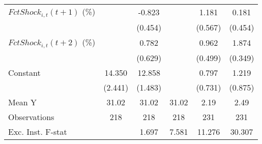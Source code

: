 {\begin{tabular}{l*{5}{c}}
\addlinespace
$ FctShock_{i,t}(t+1)$ (\%)&                     &      -0.823\sym{*}  &                     &       1.181\sym{*}  &       0.181         \\
                    &                     &     (0.454)         &                     &     (0.567)         &     (0.454)         \\
\addlinespace
$ FctShock_{i,t}(t+2)$ (\%)&                     &       0.782         &                     &       0.962\sym{*}  &       1.874\sym{***}\\
                    &                     &     (0.629)         &                     &     (0.499)         &     (0.349)         \\
\addlinespace
Constant            &      14.350\sym{***}&      12.858\sym{***}&                     &       0.797         &       1.219         \\
                    &     (2.441)         &     (1.483)         &                     &     (0.731)         &     (0.875)         \\
\midrule
Mean Y              &       31.02         &       31.02         &       31.02         &        2.19         &        2.49         \\
Observations        &         218         &         218         &         218         &         231         &         231         \\
Exc. Inst. F-stat   &                     &       1.697         &       7.581         &      11.276         &      30.307         \\
\bottomrule
\end{tabular}
}
